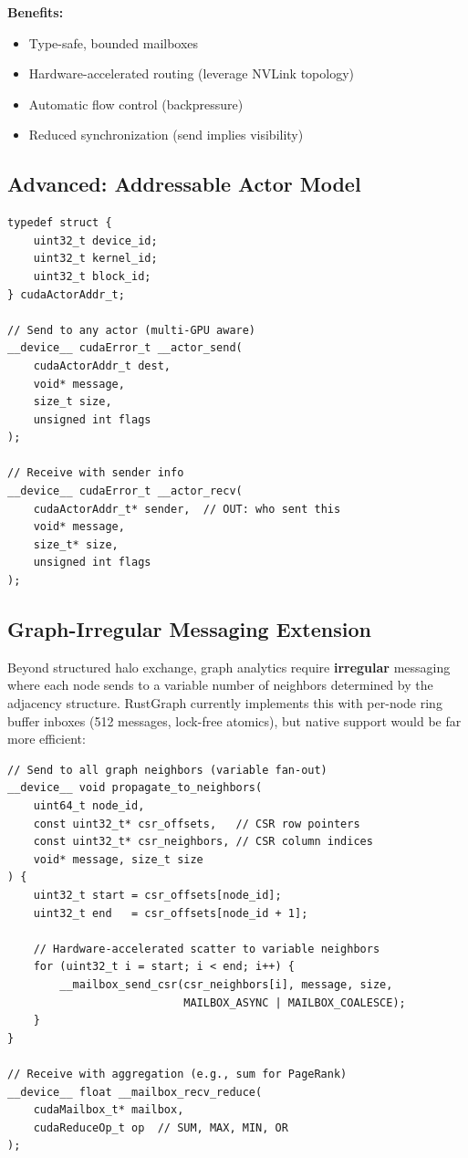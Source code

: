 \documentclass[11pt,a4paper]{article}
\newenvironment{benefitsbox}{%
    \vspace{6pt}%
    \noindent\textbf{Benefits:}%
    \begin{itemize}[leftmargin=1.5em,topsep=2pt,itemsep=1pt]%
}{%
    \end{itemize}%
    \vspace{6pt}%
}
\begin{document}
\begin{benefitsbox}
    \item Type-safe, bounded mailboxes
    \item Hardware-accelerated routing (leverage NVLink topology)
    \item Automatic flow control (backpressure)
    \item Reduced synchronization (send implies visibility)
\end{benefitsbox}

\subsection{Advanced: Addressable Actor Model}

\begin{lstlisting}[style=cstyle,title={Globally unique actor addresses}]
typedef struct {
    uint32_t device_id;
    uint32_t kernel_id;
    uint32_t block_id;
} cudaActorAddr_t;

// Send to any actor (multi-GPU aware)
__device__ cudaError_t __actor_send(
    cudaActorAddr_t dest,
    void* message,
    size_t size,
    unsigned int flags
);

// Receive with sender info
__device__ cudaError_t __actor_recv(
    cudaActorAddr_t* sender,  // OUT: who sent this
    void* message,
    size_t* size,
    unsigned int flags
);
\end{lstlisting}

\subsection{Graph-Irregular Messaging Extension}

Beyond structured halo exchange, graph analytics require \textbf{irregular} messaging where each node sends to a variable number of neighbors determined by the adjacency structure. RustGraph currently implements this with per-node ring buffer inboxes (512 messages, lock-free atomics), but native support would be far more efficient:

\begin{lstlisting}[style=cstyle,title={CSR-driven irregular messaging}]
// Send to all graph neighbors (variable fan-out)
__device__ void propagate_to_neighbors(
    uint64_t node_id,
    const uint32_t* csr_offsets,   // CSR row pointers
    const uint32_t* csr_neighbors, // CSR column indices
    void* message, size_t size
) {
    uint32_t start = csr_offsets[node_id];
    uint32_t end   = csr_offsets[node_id + 1];

    // Hardware-accelerated scatter to variable neighbors
    for (uint32_t i = start; i < end; i++) {
        __mailbox_send_csr(csr_neighbors[i], message, size,
                           MAILBOX_ASYNC | MAILBOX_COALESCE);
    }
}

// Receive with aggregation (e.g., sum for PageRank)
__device__ float __mailbox_recv_reduce(
    cudaMailbox_t* mailbox,
    cudaReduceOp_t op  // SUM, MAX, MIN, OR
);
\end{lstlisting}
\end{document}

